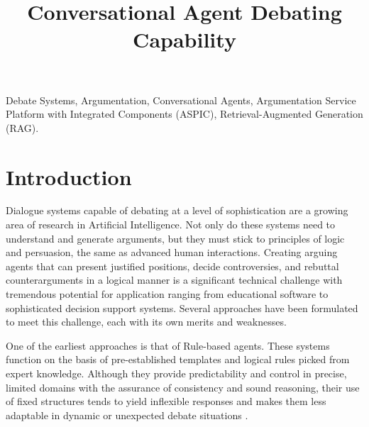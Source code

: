 \documentclass[conference]{IEEEtran}
\begin{document}
\title{Conversational Agent Debating Capability}

\author{
\and
{}
}

\maketitle

\begin{abstract}

\end{abstract}

\begin{IEEEkeywords}
Debate Systems, Argumentation, Conversational Agents, Argumentation Service Platform with Integrated Components (ASPIC), Retrieval-Augmented Generation (RAG).
\end{IEEEkeywords}

\section{Introduction}
Dialogue systems capable of debating at a level of sophistication are a growing area of research in Artificial Intelligence. Not only do these systems need to understand and generate arguments, but they must stick to principles of logic and persuasion, the same as advanced human interactions. Creating arguing agents that can present justified positions, decide controversies, and rebuttal counterarguments in a logical manner is a significant technical challenge with tremendous potential for application ranging from educational software to sophisticated decision support systems. Several approaches have been formulated to meet this challenge, each with its own merits and weaknesses.

One of the earliest approaches is that of Rule-based agents. These systems function on the basis of pre-established templates and logical rules picked from expert knowledge. Although they provide predictability and control in precise, limited domains with the assurance of consistency and sound reasoning, their use of fixed structures tends to yield inflexible responses and makes them less adaptable in dynamic or unexpected debate situations \cite{b12}.
\end{document}
